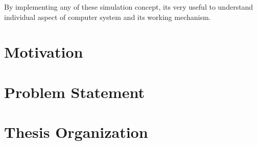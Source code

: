 \begin{onehalfspacing}
\par By implementing any of these simulation concept, its very useful to understand individual aspect of computer system and its working mechanism.


\section{Motivation}


\section{Problem Statement}


\section{Thesis Organization}

\end{onehalfspacing}